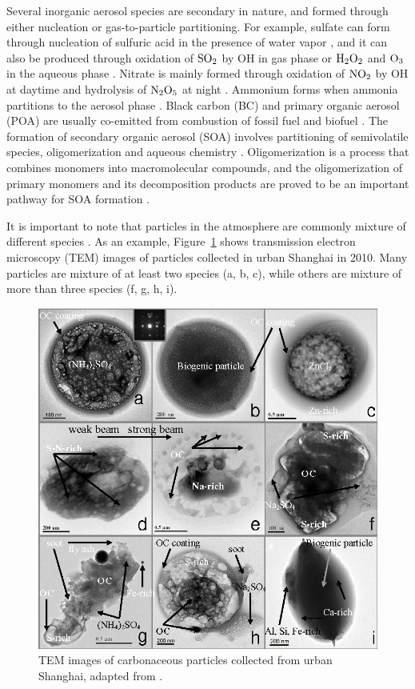 \documentclass[edeposit,fullpage]{uiucthesis2009}
\begin{document}
Several inorganic aerosol species are secondary in nature, and formed
through either nucleation or gas-to-particle partitioning. For
example, sulfate can form through nucleation of sulfuric acid in the
presence of water vapor \citep{sipila2010role}, and it can also be
produced through oxidation of $\rm SO_2$ by OH in gas phase or $\rm
H_2O_2$ and $\rm O_3$ in the aqueous phase
\citep{shao2019heterogeneous, zheng2020multiphase}. Nitrate is mainly
formed through oxidation of $\rm NO_2$ by OH at daytime and hydrolysis
of $\rm N_2O_5$ at night \citep{alexander2009quantifying}. Ammonium
forms when ammonia partitions to the aerosol phase
\citep{zhuang1999size}.  Black carbon (BC) and primary organic aerosol
(POA) are usually co-emitted from combustion of fossil fuel and
biofuel \citep{bond2007historical}. The formation of secondary organic
aerosol (SOA) involves partitioning of semivolatile species,
oligomerization and aqueous chemistry \citep{zhu2017mechanism,
  lim2010aqueous, griffin2013sources,
  mcneill2015aqueous}. Oligomerization is a process that combines
monomers into macromolecular compounds, and the oligomerization of
primary monomers and its decomposition products are proved to be an
important pathway for SOA formation \citep{tolocka2004formation}.

It is important to note that particles in the atmosphere are commonly
mixture of different species \citep{laskin2019chemical,o2015chemical}.
As an example, Figure~\ref{fig:chap1-mixing} shows transmission
electron microscopy (TEM) images of particles collected in urban
Shanghai in 2010. Many particles are mixture of at least two species
(a, b, c), while others are mixture of more than three species (f, g,
h, i).

\begin{figure}
	\centering
	\includegraphics[scale=0.40]{chap1_figs/thesis_chap1_fig2.png}
	\caption{TEM images of carbonaceous particles collected from
          urban Shanghai, adapted from \cite{fu2012morphology}.}
	\label{fig:chap1-mixing}
\end{figure}
\end{document}
